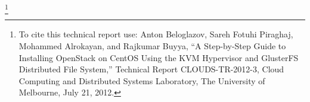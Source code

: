 \thanks{To cite this technical report use: Anton Beloglazov, Sareh Fotuhi Piraghaj, Mohammed Alrokayan, and Rajkumar Buyya, ``A Step-by-Step Guide to Installing OpenStack on CentOS Using the KVM Hypervisor and GlusterFS Distributed File System,'' Technical Report CLOUDS-TR-2012-3, Cloud Computing and Distributed Systems Laboratory, The University of Melbourne, July 21, 2012.}
